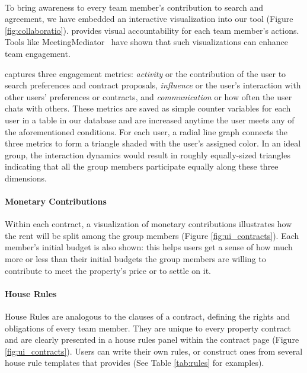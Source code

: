 \paragraph{\collaboRatio}

To bring awareness to every team member's contribution to search and agreement, we have embedded an interactive visualization into our tool (Figure \ref{fig:collaboratio}). \collaboRatio provides visual accountability for each team member's actions. Tools like  MeetingMediator~\cite{meetingmediator} have shown that such visualizations can enhance team engagement.

\collaboRatio captures three engagement metrics: \textit{activity} or the contribution of the user to search preferences and contract proposals, \textit{influence} or the user's interaction with other users' preferences or contracts, and \textit{communication} or how often the user chats with others. These metrics are saved as simple counter variables for each user in a table in our database and are increased anytime the user meets any of the aforementioned conditions. For each user, a radial line graph connects the three metrics to form a triangle shaded with the user's assigned color. In an ideal group, the interaction dynamics would result in roughly equally-sized triangles indicating that all the group members participate equally along these three dimensions. 

\paragraph{Monetary Contributions}
Within each contract, a visualization of monetary contributions illustrates how the rent will be split among the group members (Figure \ref{fig:ui_contracts}). Each member's initial budget is also shown: this helps users get a sense of how much more or less than their initial budgets the group members are willing to contribute to meet the property's price or to settle on it.


\paragraph{House Rules}
House Rules are analogous to the clauses of a contract, defining the rights and obligations of every team member. They are unique to every property contract and are clearly presented in a house rules panel within the contract page (Figure \ref{fig:ui_contracts}). Users can write their own rules, or construct ones from several house rule templates that \tool provides (See Table \ref{tab:rules} for examples). 

